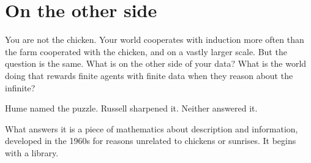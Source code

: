 \section*{On the other side}

You are not the chicken. Your world cooperates with induction more often than the farm cooperated with the chicken, and on a vastly larger scale. But the question is the same. What is on the other side of your data? What is the world doing that rewards finite agents with finite data when they reason about the infinite?

Hume named the puzzle. Russell sharpened it. Neither answered it.

What answers it is a piece of mathematics about description and information, developed in the 1960s for reasons unrelated to chickens or sunrises. It begins with a library.
